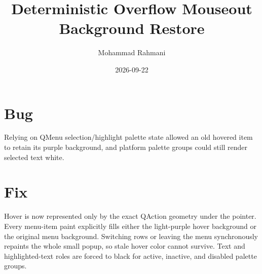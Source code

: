 \documentclass[a4paper]{article}
\title{Deterministic Overflow Mouseout Background Restore}
\date{2026-09-22}
\author{Mohammad Rahmani}
\begin{document}
   \maketitle

   \begin{preview}
      \section{Bug}
      Relying on QMenu selection/highlight palette state allowed an old hovered
      item to retain its purple background, and platform palette groups could
      still render selected text white.

      \section{Fix}
      Hover is now represented only by the exact QAction geometry under the
      pointer. Every menu-item paint explicitly fills either the light-purple
      hover background or the original menu background. Switching rows or
      leaving the menu synchronously repaints the whole small popup, so stale
      hover color cannot survive. Text and highlighted-text roles are forced to
      black for active, inactive, and disabled palette groups.
   \end{preview}

   
   
\end{document}
